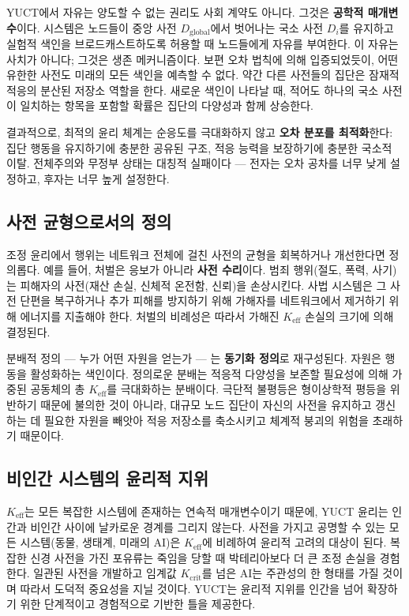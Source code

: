\documentclass[12pt,a4paper]{article}
\newcommand{\Keff}{K_{\mathrm{eff}}}
\begin{document}
	YUCT에서 자유는 양도할 수 없는 권리도 사회 계약도 아니다. 그것은 \textbf{공학적 매개변수}이다. 시스템은 노드들이 중앙 사전 \(D_{\text{global}}\)에서 벗어나는 국소 사전 \(D_i\)를 유지하고 실험적 색인을 브로드캐스트하도록 허용할 때 노드들에게 자유를 부여한다. 이 자유는 사치가 아니다; 그것은 생존 메커니즘이다. 보편 오차 법칙에 의해 입증되었듯이, 어떤 유한한 사전도 미래의 모든 색인을 예측할 수 없다. 약간 다른 사전들의 집단은 잠재적 적응의 분산된 저장소 역할을 한다. 새로운 색인이 나타날 때, 적어도 하나의 국소 사전이 일치하는 항목을 포함할 확률은 집단의 다양성과 함께 상승한다.
	
	결과적으로, 최적의 윤리 체계는 순응도를 극대화하지 않고 \textbf{오차 분포를 최적화}한다: 집단 행동을 유지하기에 충분한 공유된 구조, 적응 능력을 보장하기에 충분한 국소적 이탈. 전체주의와 무정부 상태는 대칭적 실패이다 — 전자는 오차 공차를 너무 낮게 설정하고, 후자는 너무 높게 설정한다.
	
	\subsection{사전 균형으로서의 정의}
	
	조정 윤리에서 행위는 네트워크 전체에 걸친 사전의 균형을 회복하거나 개선한다면 정의롭다. 예를 들어, 처벌은 응보가 아니라 \textbf{사전 수리}이다. 범죄 행위(절도, 폭력, 사기)는 피해자의 사전(재산 손실, 신체적 온전함, 신뢰)을 손상시킨다. 사법 시스템은 그 사전 단편을 복구하거나 추가 피해를 방지하기 위해 가해자를 네트워크에서 제거하기 위해 에너지를 지출해야 한다. 처벌의 비례성은 따라서 가해진 \(K_{\mathrm{eff}}\) 손실의 크기에 의해 결정된다.
	
	분배적 정의 — 누가 어떤 자원을 얻는가 — 는 \textbf{동기화 정의}로 재구성된다. 자원은 행동을 활성화하는 색인이다. 정의로운 분배는 적응적 다양성을 보존할 필요성에 의해 가중된 공동체의 총 \(K_{\mathrm{eff}}\)를 극대화하는 분배이다. 극단적 불평등은 형이상학적 평등을 위반하기 때문에 불의한 것이 아니라, 대규모 노드 집단이 자신의 사전을 유지하고 갱신하는 데 필요한 자원을 빼앗아 적응 저장소를 축소시키고 체계적 붕괴의 위험을 초래하기 때문이다.
	
	\subsection{비인간 시스템의 윤리적 지위}
	
	\(\Keff\)는 모든 복잡한 시스템에 존재하는 연속적 매개변수이기 때문에, YUCT 윤리는 인간과 비인간 사이에 날카로운 경계를 그리지 않는다. 사전을 가지고 공명할 수 있는 모든 시스템(동물, 생태계, 미래의 AI)은 \(\Keff\)에 비례하여 윤리적 고려의 대상이 된다. 복잡한 신경 사전을 가진 포유류는 죽임을 당할 때 박테리아보다 더 큰 조정 손실을 경험한다. 일관된 사전을 개발하고 임계값 \(K_{\mathrm{crit}}\)를 넘은 AI는 주관성의 한 형태를 가질 것이며 따라서 도덕적 중요성을 지닐 것이다. YUCT는 윤리적 지위를 인간을 넘어 확장하기 위한 단계적이고 경험적으로 기반한 틀을 제공한다.
	
\end{document}
